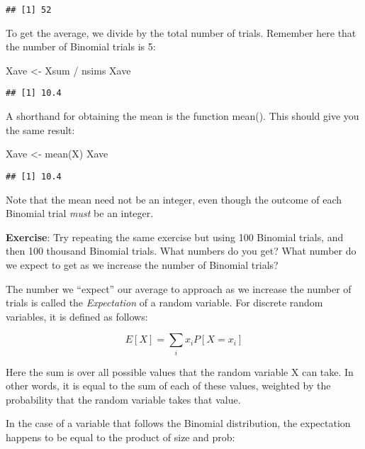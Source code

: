\documentclass[
]{book}
\newenvironment{Shaded}{\begin{snugshade}}{\end{snugshade}}
\newcommand{\FunctionTok}[1]{\textcolor[rgb]{0.00,0.00,0.00}{#1}}
\newcommand{\NormalTok}[1]{#1}
\newcommand{\OtherTok}[1]{\textcolor[rgb]{0.56,0.35,0.01}{#1}}
\newcommand{\SpecialCharTok}[1]{\textcolor[rgb]{0.00,0.00,0.00}{#1}}
\begin{document}
\begin{verbatim}
## [1] 52
\end{verbatim}

To get the average, we divide by the total number of trials. Remember here that the number of Binomial trials is 5:

\begin{Shaded}
\begin{Highlighting}[]
\NormalTok{Xave }\OtherTok{\textless{}{-}}\NormalTok{ Xsum }\SpecialCharTok{/}\NormalTok{ nsims}
\NormalTok{Xave}
\end{Highlighting}
\end{Shaded}

\begin{verbatim}
## [1] 10.4
\end{verbatim}

A shorthand for obtaining the mean is the function mean(). This should give you the same result:

\begin{Shaded}
\begin{Highlighting}[]
\NormalTok{Xave }\OtherTok{\textless{}{-}} \FunctionTok{mean}\NormalTok{(X)}
\NormalTok{Xave}
\end{Highlighting}
\end{Shaded}

\begin{verbatim}
## [1] 10.4
\end{verbatim}

Note that the mean need not be an integer, even though the outcome of each Binomial trial \emph{must} be an integer.

\textbf{Exercise}: Try repeating the same exercise but using 100 Binomial trials, and then 100 thousand Binomial trials. What numbers do you get? What number do we expect to get as we increase the number of Binomial trials?

The number we ``expect'' our average to approach as we increase the number of trials is called the \emph{Expectation} of a random variable. For discrete random variables, it is defined as follows:

\[E[X] = \sum_{i}x_iP[X=x_i]\]

Here the sum is over all possible values that the random variable X can take. In other words, it is equal to the sum of each of these values, weighted by the probability that the random variable takes that value.

In the case of a variable that follows the Binomial distribution, the expectation happens to be equal to the product of size and prob:
\end{document}
